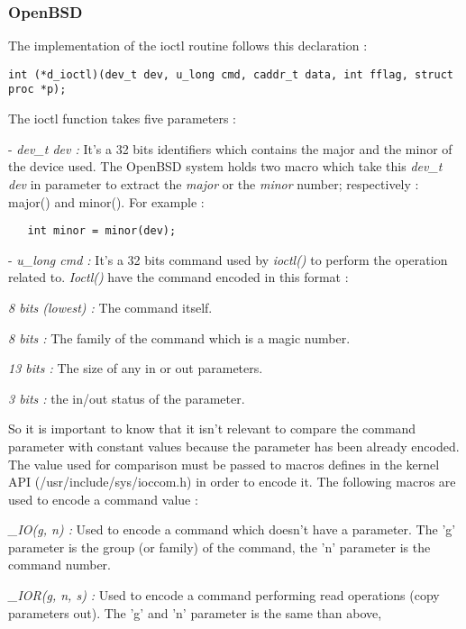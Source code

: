 \documentclass[11pt]{report}
\begin{document}
\subsubsection{OpenBSD}
The implementation of the ioctl routine follows this declaration :
\begin{lstlisting}
int (*d_ioctl)(dev_t dev, u_long cmd, caddr_t data, int fflag, struct proc *p);
\end{lstlisting}
The ioctl function takes five parameters :
\begin{description}
  \item{- {\it dev\_t dev :} It's a 32 bits identifiers which contains the major and the
  minor of the device used. The OpenBSD system holds two macro which take this
  {\it dev\_t dev} in parameter to extract the {\it major} or the {\it minor} number;
  respectively : major() and minor(). For example :
  \begin{lstlisting}
   int minor = minor(dev);
  \end{lstlisting}}
  \item{- {\it u\_long cmd :} It's a 32 bits command used by {\it ioctl()} to perform
  the operation related to. {\it Ioctl()} have the command encoded in this format :
    \begin{description}
      \item{{\it 8 bits (lowest) :} The command itself.}
      \item{{\it 8 bits :} The family of the command which is a magic number.}
      \item{{\it 13 bits :} The size of any in or out parameters.}
      \item{{\it 3 bits :} the in/out status of the parameter.}
    \end{description}
  So it is important to know that it isn't relevant to compare the command parameter
  with constant values because the parameter has been already encoded. The value used
  for comparison must be passed to macros defines in the kernel API
  (/usr/include/sys/ioccom.h) in order to encode it. The following macros are used to
  encode a command value :
    \begin{description}
      \item{{\it \_IO(g, n) :} Used to encode a command which doesn't have a parameter.
      The 'g' parameter is the group (or family) of the command, the 'n' parameter is the
      command number.}
      \item{{\it \_IOR(g, n, s) :} Used to encode a command performing read
      operations (copy parameters out). The 'g' and 'n' parameter is the same than above,
}
\end{description}}
\end{description}
\end{document}
